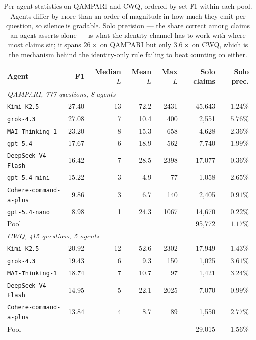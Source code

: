 \documentclass{article}
\begin{document}
\begin{table}[H]
  \caption{Per-agent statistics on QAMPARI and CWQ, ordered by set F1 within each pool. Agents differ by more than an order of magnitude in how much they emit per question, so silence is gradable. Solo precision --- the share correct among claims an agent asserts alone --- is what the identity channel has to work with where most claims sit; it spans $26\times$ on QAMPARI but only $3.6\times$ on CWQ, which is the mechanism behind the identity-only rule failing to beat counting on either.}
  \label{tab:lengths}
  \centering
  \begin{tabular}{lrrrrrr}
    \toprule
    Agent & F1 & Median $L$ & Mean $L$ & Max $L$ & Solo claims & Solo prec. \\
    \midrule
    \multicolumn{7}{l}{\emph{QAMPARI, 777 questions, 8 agents}} \\
    \texttt{Kimi-K2.5}             & 27.40 & 13 & 72.2 & 2431 & 45,643 & $1.24\%$ \\
    \texttt{grok-4.3}              & 27.08 &  7 & 10.4 &  400 &  2,551 & $\mathbf{5.76\%}$ \\
    \texttt{MAI-Thinking-1}        & 23.20 &  8 & 15.3 &  658 &  4,628 & $2.36\%$ \\
    \texttt{gpt-5.4}               & 17.67 &  6 & 18.9 &  562 &  7,740 & $1.99\%$ \\
    \texttt{DeepSeek-V4-Flash}     & 16.42 &  7 & 28.5 & 2398 & 17,077 & $0.36\%$ \\
    \texttt{gpt-5.4-mini}          & 15.22 &  3 &  4.9 &   77 &  1,058 & $2.65\%$ \\
    \texttt{Cohere-command-a-plus} &  9.86 &  3 &  6.7 &  140 &  2,405 & $0.91\%$ \\
    \texttt{gpt-5.4-nano}          &  8.98 &  1 & 24.3 & 1067 & 14,670 & $0.22\%$ \\
    \midrule
    Pool                           &       &    &      &      & 95,772 & $1.17\%$ \\
    \midrule
    \multicolumn{7}{l}{\emph{CWQ, 415 questions, 5 agents}} \\
    \texttt{Kimi-K2.5}             & 20.92 & 12 & 52.6 & 2302 & 17,949 & $1.43\%$ \\
    \texttt{grok-4.3}              & 19.43 &  6 &  9.3 &  150 &  1,025 & $\mathbf{3.61\%}$ \\
    \texttt{MAI-Thinking-1}        & 18.74 &  7 & 10.7 &   97 &  1,421 & $3.24\%$ \\
    \texttt{DeepSeek-V4-Flash}     & 14.95 &  5 & 22.1 & 2025 &  7,070 & $0.99\%$ \\
    \texttt{Cohere-command-a-plus} & 13.84 &  4 &  8.7 &   89 &  1,550 & $2.77\%$ \\
    \midrule
    Pool                           &       &    &      &      & 29,015 & $1.56\%$ \\
    \bottomrule
  \end{tabular}
\end{table}
\end{document}
